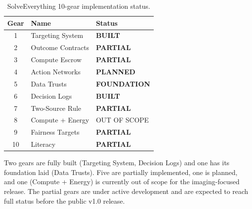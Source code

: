 \begin{table}[t]
\centering
\caption{SolveEverything 10-gear implementation status.}
\label{tab:gears}
\smallskip
\begin{tabular}{@{}cll@{}}
\toprule
\textbf{Gear} & \textbf{Name} & \textbf{Status} \\
\midrule
 1 & Targeting System    & \textcolor{built}{\textbf{BUILT}}    \\
 2 & Outcome Contracts   & \textcolor{partial}{\textbf{PARTIAL}} \\
 3 & Compute Escrow      & \textcolor{partial}{\textbf{PARTIAL}} \\
 4 & Action Networks     & \textcolor{planned}{\textbf{PLANNED}} \\
 5 & Data Trusts         & \textcolor{built}{\textbf{FOUNDATION}} \\
 6 & Decision Logs       & \textcolor{built}{\textbf{BUILT}}    \\
 7 & Two-Source Rule     & \textcolor{partial}{\textbf{PARTIAL}} \\
 8 & Compute + Energy    & \textcolor{planned}{OUT OF SCOPE}     \\
 9 & Fairness Targets    & \textcolor{partial}{\textbf{PARTIAL}} \\
10 & Literacy            & \textcolor{partial}{\textbf{PARTIAL}} \\
\bottomrule
\end{tabular}
\end{table}

Two gears are fully built (Targeting System, Decision Logs) and one has its foundation laid (Data Trusts).  Five are partially implemented, one is
planned, and one (Compute + Energy) is currently out of scope for the
imaging-focused release.  The partial gears are under active development
and are expected to reach full status before the public v1.0 release.
